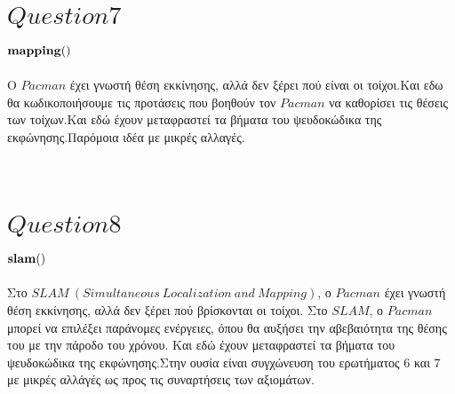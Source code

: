 \documentclass[10pt]{article}
\begin{document}
\section*{$Question 7$}
\vspace{5mm}
\underline{\underline{$\bf  mapping()$}} \\ \\
Ο $Pacman$ έχει γνωστή θέση εκκίνησης, αλλά δεν ξέρει πού είναι οι τοίχοι.Και εδω θα κωδικοποιήσουμε τις προτάσεις που βοηθούν τον $Pacman$ να καθορίσει τις θέσεις των τοίχων.Και εδώ έχουν μεταφραστεί τα βήματα του ψευδοκώδικα της εκφώνησης.Παρόμοια ιδέα με μικρές αλλαγές.
\\ \\ \\
\section*{$Question 8$}
\vspace{5mm}
\underline{\underline{$\bf  slam()$}} \\ \\
Στο $SLAM \ (Simultaneous 
 \ Localization \  and \  Mapping)$, ο $Pacman$ έχει γνωστή θέση εκκίνησης, αλλά δεν ξέρει πού βρίσκονται οι τοίχοι. Στο $SLAM$, ο $Pacman$ μπορεί να επιλέξει παράνομες ενέργειες, όπου θα αυξήσει την αβεβαιότητα της θέσης του με την πάροδο του χρόνου. Και εδώ έχουν μεταφραστεί τα βήματα του ψευδοκώδικα της εκφώνησης.Στην ουσία είναι συγχώνευση του ερωτήματος 6 και 7 με μικρές αλλάγές ως προς τις συναρτήσεις των αξιομάτων.
\end{document}
